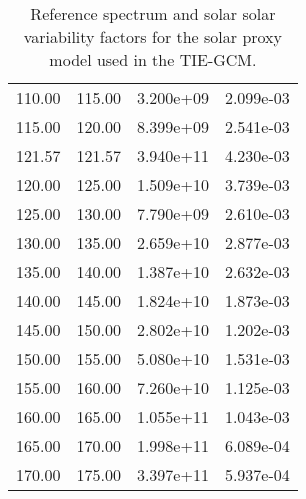 \begin{table}[tb]
\begin{tabular}{|c |c|c|c|}
  110.00  &  115.00   &       3.200e+09     &       2.099e-03 \\
  115.00  &  120.00   &       8.399e+09     &       2.541e-03 \\
  121.57  &  121.57   &       3.940e+11     &       4.230e-03 \\
  120.00  &  125.00   &       1.509e+10     &       3.739e-03 \\
  125.00  &  130.00   &       7.790e+09     &       2.610e-03 \\
  130.00  &  135.00   &       2.659e+10     &       2.877e-03 \\
  135.00  &  140.00   &       1.387e+10     &       2.632e-03 \\
  140.00  &  145.00   &       1.824e+10     &       1.873e-03 \\
  145.00  &  150.00   &       2.802e+10     &       1.202e-03 \\
  150.00  &  155.00   &       5.080e+10     &       1.531e-03 \\
  155.00  &  160.00   &       7.260e+10     &       1.125e-03 \\
  160.00  &  165.00   &       1.055e+11     &       1.043e-03 \\
  165.00  &  170.00   &       1.998e+11     &       6.089e-04 \\
  170.00  &  175.00   &       3.397e+11     &       5.937e-04 
\\ \hline \hline
\end{tabular}
\caption{Reference spectrum and solar solar variability factors for 
the solar proxy model used in the TIE-GCM.}
\label{tab:solar_refspectrum}
\end{table}
%
